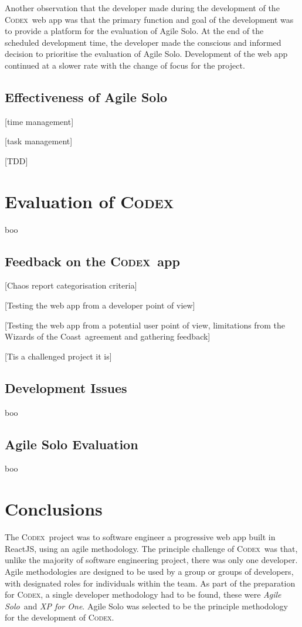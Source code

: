 \documentclass[final]{cmpreport}
\newcommand{\WotC}{Wizards of the Coast}
\newcommand{\Codex}{\textsc{Codex}}
\newcommand{\AgileSolo}{\emph{Agile Solo}}
\begin{document}
		Another observation that the developer made during the development of the \Codex \ web app was that the primary function and goal of the development was to provide a platform for the evaluation of Agile Solo. At the end of the scheduled development time, the developer made the conscious and informed decision to prioritise the evaluation of Agile Solo. Development of the web app continued at a slower rate with the change of focus for the project.
					
		\subsection{Effectiveness of Agile Solo} \label{sec:agile-solo-effect}
		[time management]
		
		[task management]
		
		[TDD]
		
		
	\section{Evaluation of \Codex} \label{sec:evaluation}
	boo
	
		\subsection{Feedback on the \Codex \ app} \label{sec:feedback}
		[Chaos report categorisation criteria]
	
		[Testing the web app from a developer point of view]
	
		[Testing the web app from a potential user point of view, limitations from the \WotC \ agreement and gathering feedback]
	
		[Tis a challenged project it is]
		
		\subsection{Development Issues} \label{sec:dev-eval}
		boo
			
		\subsection{Agile Solo Evaluation} \label{sec:agile-solo-eval}
		boo
			
	\section{Conclusions} \label{sec:conclusions}
	The \Codex \ project was to software engineer a progressive web app built in ReactJS, using an agile methodology. The principle challenge of \Codex \ was that, unlike the majority of software engineering project, there was only one developer. Agile methodologies are designed to be used by a group or groups of developers, with designated roles for individuals within the team. As part of the preparation for \Codex, a single developer methodology had to be found, these were \AgileSolo \ and \emph{XP for One}. Agile Solo was selected to be the principle methodology for the development of \Codex. 
	
\end{document}
